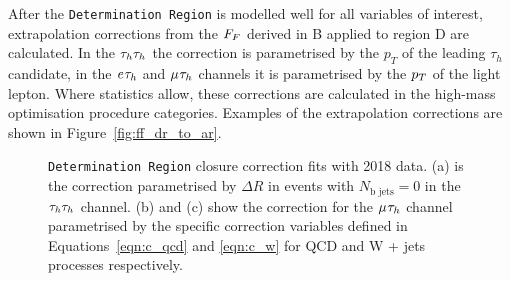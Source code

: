 After the \texttt{Determination Region} is modelled well for all variables of interest, extrapolation corrections from the $F_{F}$ derived in B applied to region D are calculated.
In the $\tau_{h}\tau_{h}$ the correction is parametrised by the $p_{T}$ of the leading $\tau_h$ candidate, in the $e_{}\tau_{h}$ and $\mu_{}\tau_{h}$ channels it is parametrised by the $p_{T}$ of the light lepton.
Where statistics allow, these corrections are calculated in the high-mass optimisation procedure categories.
Examples of the extrapolation corrections are shown in Figure~\ref{fig:ff_dr_to_ar}.

\begin{figure}[!hbtp]
\centering
\caption{\texttt{Determination Region} closure correction fits with 2018 data. (a) is the correction parametrised by $\Delta R$ in events with $N_{\text{b jets}}=0$ in the $\tau_{h}\tau_{h}$ channel. (b) and (c) show the correction for the $\mu_{}\tau_{h}$ channel parametrised by the specific correction variables defined in Equations~\ref{eqn:c_qcd} and \ref{eqn:c_w} for QCD and W + jets processes respectively.}
\label{fig:ff_dr}
\end{figure}

